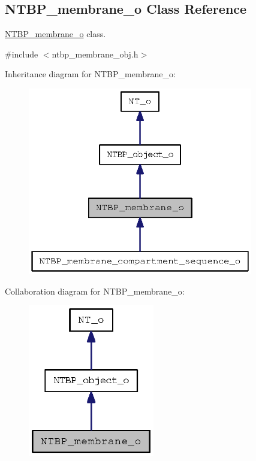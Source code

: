 \subsection{NTBP\_\-membrane\_\-o Class Reference}
\label{class_n_t_b_p__membrane__o}


\hyperlink{class_n_t_b_p__membrane__o}{NTBP\_\-membrane\_\-o} class.  




{\ttfamily \#include $<$ntbp\_\-membrane\_\-obj.h$>$}



Inheritance diagram for NTBP\_\-membrane\_\-o:
\nopagebreak
\begin{figure}[H]
\begin{center}
\leavevmode
\includegraphics[width=278pt]{class_n_t_b_p__membrane__o__inherit__graph}
\end{center}
\end{figure}


Collaboration diagram for NTBP\_\-membrane\_\-o:
\nopagebreak
\begin{figure}[H]
\begin{center}
\leavevmode
\includegraphics[width=156pt]{class_n_t_b_p__membrane__o__coll__graph}
\end{center}
\end{figure}
